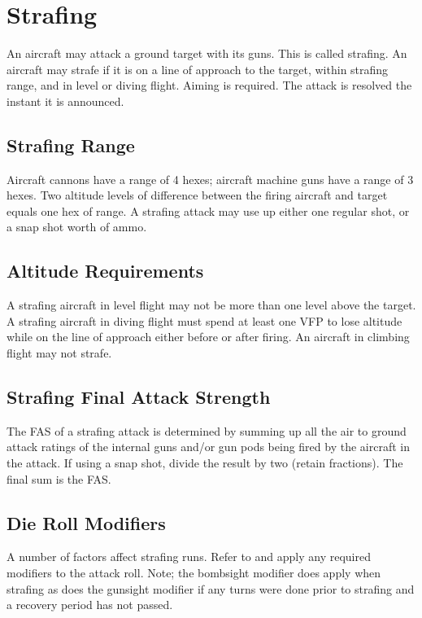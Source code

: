 

\section{Strafing}
\label{rule:strafing}

An aircraft may attack a ground target with its guns. This is called strafing. An aircraft may strafe if it is on a line of approach to the target, within strafing range, and in level or diving flight. Aiming is required. The attack is resolved the instant it is announced.

\subsection{Strafing Range} Aircraft cannons have a range of 4 hexes; aircraft machine guns have a range of 3 hexes. Two altitude levels of difference between the firing aircraft and target equals one hex of range. A strafing attack may use up either one regular shot, or a snap shot worth of ammo.

\subsection{Altitude Requirements} A strafing aircraft in level flight may not be more than one level above the target. A strafing aircraft in diving flight must spend at least one VFP to lose altitude while on the line of approach either before or after firing. An aircraft in climbing flight may not strafe.

\subsection{Strafing Final Attack Strength} The FAS of a strafing attack is determined by summing up all the air to ground attack ratings of the internal guns and/or gun pods being fired by the aircraft in the attack. If using a snap shot, divide the result by two (retain fractions). The final sum is the FAS.

\subsection{Die Roll Modifiers} A number of factors affect strafing runs. Refer to  and apply any required modifiers to the attack roll. Note; the bombsight modifier does apply when strafing as does the gunsight modifier if any turns were done prior to strafing and a recovery period has not passed.

